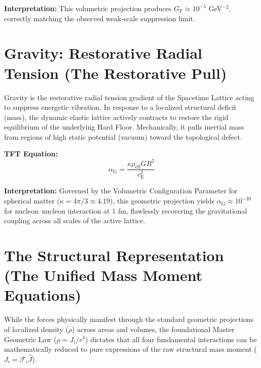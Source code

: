 \vspace{0.5em}
\noindent\textbf{Interpretation:} This volumetric projection produces $G_{\mathrm{F}} \approx 10^{-5}$ GeV$^{-2}$, correctly matching the observed weak-scale suppression limit.

\section{Gravity: Restorative Radial Tension (The Restorative Pull)}
Gravity is the restorative radial tension gradient of the Spacetime Lattice acting to suppress energetic vibration. In response to a localized structural deficit (mass), the dynamic elastic lattice actively contracts to restore the rigid equilibrium of the underlying Hard Floor. Mechanically, it pulls inertial mass from regions of high static potential (vacuum) toward the topological defect.

\vspace{0.5em}
\noindent\textbf{TFT Equation:}
\begin{equation}
    \alpha_{\mathrm{G}} = \frac{\kappa \rho_{\mathrm{eff}} G R^2}{c_{\mathrm{E}}^2}
\end{equation}

\vspace{0.5em}
\noindent\textbf{Interpretation:} Governed by the Volumetric Configuration Parameter for spherical matter ($\kappa = 4\pi/3 \approx 4.19$), this geometric projection yields $\alpha_{\mathrm{G}} \approx 10^{-39}$ for nucleon--nucleon interaction at $1$ fm, flawlessly recovering the gravitational coupling across all scales of the active lattice.

\section{The Structural Representation (The Unified Mass Moment Equations)}
While the forces physically manifest through the standard geometric projections of localized density ($\rho$) across areas and volumes, the foundational Master Geometric Law ($\rho = J_i/r^4$) dictates that all four fundamental interactions can be mathematically reduced to pure expressions of the raw structural mass moment ($J_i = \mathcal{F}_i \hat{J}$).


